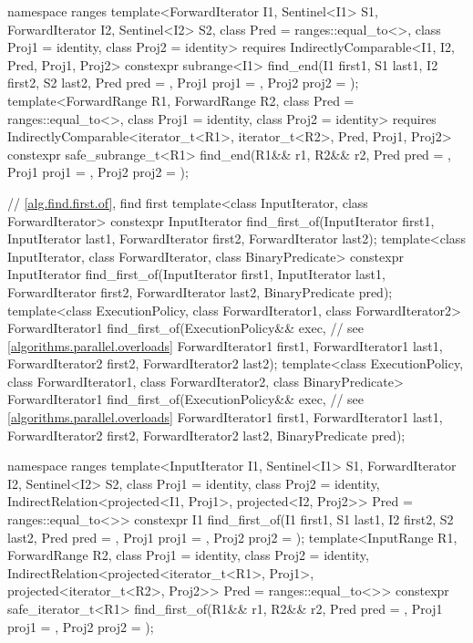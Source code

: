 \begin{codeblock}
{  namespace ranges {
    template<ForwardIterator I1, Sentinel<I1> S1, ForwardIterator I2, Sentinel<I2> S2,
             class Pred = ranges::equal_to<>, class Proj1 = identity, class Proj2 = identity>
      requires IndirectlyComparable<I1, I2, Pred, Proj1, Proj2>
      constexpr subrange<I1>
        find_end(I1 first1, S1 last1, I2 first2, S2 last2, Pred pred = {},
                 Proj1 proj1 = {}, Proj2 proj2 = {});
    template<ForwardRange R1, ForwardRange R2,
             class Pred = ranges::equal_to<>, class Proj1 = identity, class Proj2 = identity>
      requires IndirectlyComparable<iterator_t<R1>, iterator_t<R2>, Pred, Proj1, Proj2>
      constexpr safe_subrange_t<R1>
        find_end(R1&& r1, R2&& r2, Pred pred = {},
                 Proj1 proj1 = {}, Proj2 proj2 = {});
  }

  // \ref{alg.find.first.of}, find first
  template<class InputIterator, class ForwardIterator>
    constexpr InputIterator
      find_first_of(InputIterator first1, InputIterator last1,
                    ForwardIterator first2, ForwardIterator last2);
  template<class InputIterator, class ForwardIterator, class BinaryPredicate>
    constexpr InputIterator
      find_first_of(InputIterator first1, InputIterator last1,
                    ForwardIterator first2, ForwardIterator last2,
                    BinaryPredicate pred);
  template<class ExecutionPolicy, class ForwardIterator1, class ForwardIterator2>
    ForwardIterator1
      find_first_of(ExecutionPolicy&& exec, // see \ref{algorithms.parallel.overloads}
                    ForwardIterator1 first1, ForwardIterator1 last1,
                    ForwardIterator2 first2, ForwardIterator2 last2);
  template<class ExecutionPolicy, class ForwardIterator1,
           class ForwardIterator2, class BinaryPredicate>
    ForwardIterator1
      find_first_of(ExecutionPolicy&& exec, // see \ref{algorithms.parallel.overloads}
                    ForwardIterator1 first1, ForwardIterator1 last1,
                    ForwardIterator2 first2, ForwardIterator2 last2,
                    BinaryPredicate pred);

  namespace ranges {
    template<InputIterator I1, Sentinel<I1> S1, ForwardIterator I2, Sentinel<I2> S2,
             class Proj1 = identity, class Proj2 = identity,
             IndirectRelation<projected<I1, Proj1>,
                              projected<I2, Proj2>> Pred = ranges::equal_to<>>
      constexpr I1 find_first_of(I1 first1, S1 last1, I2 first2, S2 last2,
                                 Pred pred = {},
                                 Proj1 proj1 = {}, Proj2 proj2 = {});
    template<InputRange R1, ForwardRange R2, class Proj1 = identity, class Proj2 = identity,
             IndirectRelation<projected<iterator_t<R1>, Proj1>,
                              projected<iterator_t<R2>, Proj2>> Pred = ranges::equal_to<>>
      constexpr safe_iterator_t<R1>
        find_first_of(R1&& r1, R2&& r2,
                      Pred pred = {},
                      Proj1 proj1 = {}, Proj2 proj2 = {});
  }

}
\end{codeblock}
